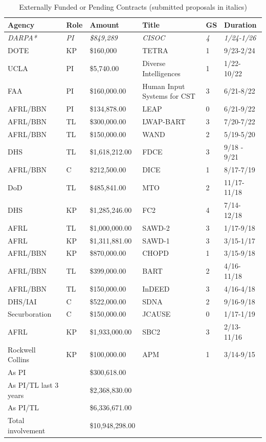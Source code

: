 \documentclass[12pt,letterpaper]{report}
\begin{document}
\begin{table}[ht!]
  \caption{Externally Funded or Pending Contracts (submitted proposals in italics)}
  \label{funding}
    \centering
    \begin{tabular}{|l|l|l|l|l|l|}
    \hline
        Agency & Role & Amount & Title & GS & Duration \\ \hline
        \textit{DARPA*} & \textit{PI} & \textit{\$849,289} & \textit{CISOC} & \textit{4} & \textit{1/24-1/26} \\
        DOTE & KP & \$160,000 & TETRA & 1 &9/23-2/24 \\
        UCLA & PI & \$5,740.00 & Diverse Intelligences  & 1 & 1/22-10/22 \\ 
        FAA & PI & \$160,000.00 & Human Input Systems for CST  & 3 & 6/21-8/22 \\ 
        AFRL/BBN & PI & \$134,878.00 & LEAP & 0 & 6/21-9/22 \\ 
        AFRL/BBN & TL & \$300,000.00 & LWAP-BART & 3 & 7/20-7/22 \\ 
        AFRL/BBN & TL & \$150,000.00 & WAND  & 2 &  5/19-5/20 \\ 
        DHS    & TL     & \$1,618,212.00 & FDCE   & 3  & 9/18 - 9/21 \\ 
        AFRL/BBN & C     & \$212,500.00 & DICE & 1 &8/17-7/19 \\ 
        DoD    & TL     & \$485,841.00 & MTO & 2 & 11/17-11/18 \\ 
        DHS    & KP     & \$1,285,246.00 & FC2  & 4 &  7/14-12/18 \\ 
        AFRL   & TL     & \$1,000,000.00 & SAWD-2 &3 & 1/17-9/18 \\ 
        AFRL   & KP     & \$1,311,881.00 & SAWD-1 & 3 & 3/15-1/17 \\ 
        AFRL/BBN & KP     & \$870,000.00 & CHOPD & 1 &  3/15-9/18 \\ 
        AFRL/BBN & TL     & \$399,000.00 & BART & 2 & 4/16-11/18 \\ 
        AFRL/BBN & TL     & \$150,000.00 & InDEED & 3  &4/16-4/18 \\ 
        DHS/IAI & C     & \$522,000.00 & SDNA & 2 & 9/16-9/18 \\ 
        Securboration & C     & \$150,000.00 & JCAUSE & 0&  1/17-1/19 \\ 
        AFRL   & KP     & \$1,933,000.00 & SBC2  & 3 & 2/13-11/16 \\ 
        Rockwell Collins&KP  &\$100,000.00& APM & 1 & 3/14-9/15\\ \hline
As PI & & 		\$300,618.00 & \\
As PI/TL last 3 years & & 		\$2,368,830.00 & \\
As PI/TL & & \$6,336,671.00 & \\
Total involvement  &&		\$10,948,298.00 & \\ \hline
    \end{tabular}
\end{table}
\end{document}
